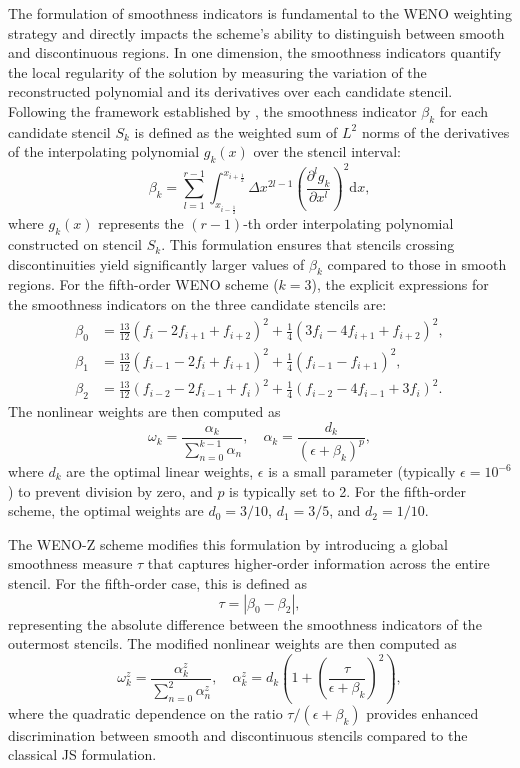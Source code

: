 The formulation of smoothness indicators is fundamental to the WENO weighting strategy and directly impacts the scheme's ability to distinguish between smooth and discontinuous regions. In one dimension, the smoothness indicators quantify the local regularity of the solution by measuring the variation of the reconstructed polynomial and its derivatives over each candidate stencil. Following the framework established by \citet{JiangShu1996}, the smoothness indicator $\beta_k$ for each candidate stencil $S_k$ is defined as the weighted sum of $L^2$ norms of the derivatives of the interpolating polynomial $g_k(x)$ over the stencil interval:
\begin{equation}
\beta_k = \sum_{l=1}^{r-1} \int_{x_{i-\frac{1}{2}}}^{x_{i+\frac{1}{2}}} \Delta x^{2l-1} \left( \frac{\partial^l g_k}{\partial x^l} \right)^2 \mathrm{d}x,
\end{equation}
where $g_k(x)$ represents the $(r-1)$-th order interpolating polynomial constructed on stencil $S_k$. This formulation ensures that stencils crossing discontinuities yield significantly larger values of $\beta_k$ compared to those in smooth regions. For the fifth-order WENO scheme ($k=3$), the explicit expressions for the smoothness indicators on the three candidate stencils are:
\begin{align}
\beta_0 &= \frac{13}{12}(f_i - 2f_{i+1} + f_{i+2})^2 + \frac{1}{4}(3f_i - 4f_{i+1} + f_{i+2})^2, \\
\beta_1 &= \frac{13}{12}(f_{i-1} - 2f_i + f_{i+1})^2 + \frac{1}{4}(f_{i-1} - f_{i+1})^2, \\
\beta_2 &= \frac{13}{12}(f_{i-2} - 2f_{i-1} + f_i)^2 + \frac{1}{4}(f_{i-2} - 4f_{i-1} + 3f_i)^2.
\end{align}
The nonlinear weights are then computed as
\begin{equation}
\omega_k = \frac{\alpha_k}{\sum_{n=0}^{k-1} \alpha_n}, \quad \alpha_k = \frac{d_k}{(\epsilon + \beta_k)^p},
\end{equation}
where $d_k$ are the optimal linear weights, $\epsilon$ is a small parameter (typically $\epsilon = 10^{-6}$) to prevent division by zero, and $p$ is typically set to 2. For the fifth-order scheme, the optimal weights are $d_0 = 3/10$, $d_1 = 3/5$, and $d_2 = 1/10$.

The WENO-Z scheme modifies this formulation by introducing a global smoothness measure $\tau$ that captures higher-order information across the entire stencil. For the fifth-order case, this is defined as
\begin{equation}
\tau = |\beta_0 - \beta_2|,
\end{equation}
representing the absolute difference between the smoothness indicators of the outermost stencils. The modified nonlinear weights are then computed as
\begin{equation}
\omega_k^z = \frac{\alpha_k^z}{\sum_{n=0}^{2} \alpha_n^z}, \quad \alpha_k^z = d_k \left(1 + \left(\frac{\tau}{\epsilon + \beta_k}\right)^2\right),
\end{equation}
where the quadratic dependence on the ratio $\tau/(\epsilon + \beta_k)$ provides enhanced discrimination between smooth and discontinuous stencils compared to the classical JS formulation.

